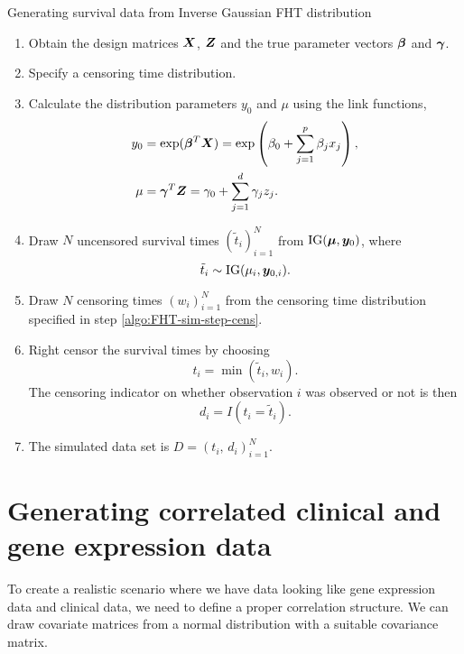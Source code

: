 \begin{algorithm}
\caption{Generating survival data from Inverse Gaussian FHT distribution}
\label{algo:FHT-sim}
\begin{enumerate}
    \item Obtain the design matrices $\bm{X}$, $\bm{Z}$ and the true parameter vectors $\boldsymbol{\beta}$ and $\boldsymbol{\gamma}$.
    \item\label{algo:FHT-sim-step-cens} Specify a censoring time distribution.
    \item Calculate the distribution parameters $y_0$ and $\mu$ using the link functions,
        \begin{align*}
            y_0&=\exp(\boldsymbol{\beta}^T\bm{X})=\exp\left(\beta_0+\sum_{j=1}^p\beta_jx_j\right), \\
            \mu&=\boldsymbol{\gamma}^T\bm{Z}=\gamma_0+\sum_{j=1}^d\gamma_jz_j.
        \end{align*}
    \item Draw $N$ uncensored survival times $(\tilde{t}_i)_{i=1}^N$ from $\operatorname{IG}(\boldsymbol{\mu},\boldsymbol{y}_0)$, where
        \begin{equation*}
            \tilde{t}_i\sim\operatorname{IG}(\mu_i,\bm{y}_{0,i}).
        \end{equation*}
    \item Draw $N$ censoring times $(w_i)_{i=1}^N$ from the censoring time distribution specified in step \ref{algo:FHT-sim-step-cens}.
    \item Right censor the survival times by choosing
            \begin{equation*}
                t_i=\min(\tilde{t}_i,w_i).
            \end{equation*}
          The censoring indicator on whether observation $i$ was observed or not is then
          \begin{equation*}
            d_i=I(t_i=\tilde{t}_i).
          \end{equation*}
    \item The simulated data set is $D=(t_i,\,d_i)_{i=1}^N$.
\end{enumerate}
\end{algorithm}

\section{Generating correlated clinical and gene expression data}
To create a realistic scenario where we have data looking like gene expression data and clinical data, we need to define a proper correlation structure.
We can draw covariate matrices from a normal distribution with a suitable covariance matrix.

